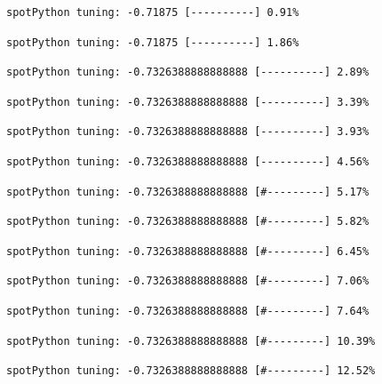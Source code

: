 \documentclass[
  letterpaper,
  DIV=11,
  numbers=noendperiod]{scrreprt}
\begin{document}
\begin{verbatim}
spotPython tuning: -0.71875 [----------] 0.91% 
\end{verbatim}

\begin{verbatim}
spotPython tuning: -0.71875 [----------] 1.86% 
\end{verbatim}

\begin{verbatim}
spotPython tuning: -0.7326388888888888 [----------] 2.89% 
\end{verbatim}

\begin{verbatim}
spotPython tuning: -0.7326388888888888 [----------] 3.39% 
\end{verbatim}

\begin{verbatim}
spotPython tuning: -0.7326388888888888 [----------] 3.93% 
\end{verbatim}

\begin{verbatim}
spotPython tuning: -0.7326388888888888 [----------] 4.56% 
\end{verbatim}

\begin{verbatim}
spotPython tuning: -0.7326388888888888 [#---------] 5.17% 
\end{verbatim}

\begin{verbatim}
spotPython tuning: -0.7326388888888888 [#---------] 5.82% 
\end{verbatim}

\begin{verbatim}
spotPython tuning: -0.7326388888888888 [#---------] 6.45% 
\end{verbatim}

\begin{verbatim}
spotPython tuning: -0.7326388888888888 [#---------] 7.06% 
\end{verbatim}

\begin{verbatim}
spotPython tuning: -0.7326388888888888 [#---------] 7.64% 
\end{verbatim}

\begin{verbatim}
spotPython tuning: -0.7326388888888888 [#---------] 10.39% 
\end{verbatim}

\begin{verbatim}
spotPython tuning: -0.7326388888888888 [#---------] 12.52% 
\end{verbatim}
\end{document}
